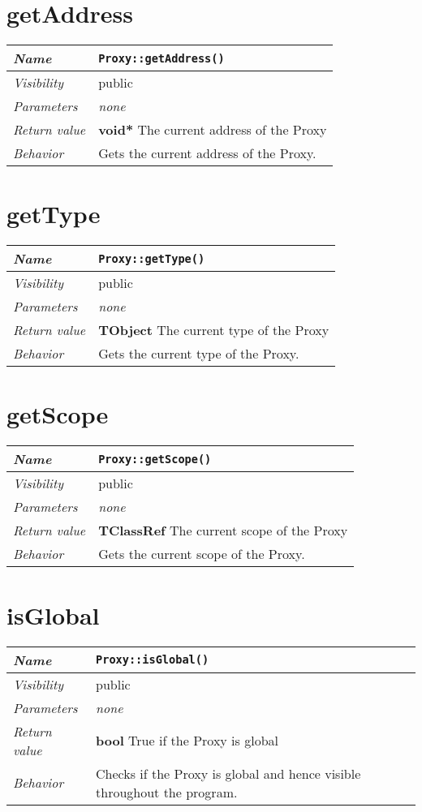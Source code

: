  \section{getAddress}
\begin{longtable}{p{3cm} @{\hskip 1cm} p{12cm}}
 \hline
\textit{Name} & \texttt{Proxy::getAddress()}\\
\hline
 \textit{Visibility} & public\\
\hline
\textit{Parameters} & \textit{none}\\
\hline
\textit{Return value} & \textbf{ void*} The current address of the Proxy \\
  \hline
 \textit{Behavior} & Gets the current address of the Proxy. \\
\hline
\end{longtable} \pagebreak
 \section{getType}
\begin{longtable}{p{3cm} @{\hskip 1cm} p{12cm}}
 \hline
\textit{Name} & \texttt{Proxy::getType()}\\
\hline
 \textit{Visibility} & public\\
\hline
\textit{Parameters} & \textit{none}\\
\hline
\textit{Return value} & \textbf{ TObject} The current type of the Proxy \\
  \hline
 \textit{Behavior} & Gets the current type of the Proxy. \\
\hline
\end{longtable} \pagebreak
 \section{getScope}
\begin{longtable}{p{3cm} @{\hskip 1cm} p{12cm}}
 \hline
\textit{Name} & \texttt{Proxy::getScope()}\\
\hline
 \textit{Visibility} & public\\
\hline
\textit{Parameters} & \textit{none}\\
\hline
\textit{Return value} & \textbf{ TClassRef} The current scope of the Proxy \\
  \hline
 \textit{Behavior} & Gets the current scope of the Proxy. \\
\hline
\end{longtable} \pagebreak
 \section{isGlobal}
\begin{longtable}{p{3cm} @{\hskip 1cm} p{12cm}}
 \hline
\textit{Name} & \texttt{Proxy::isGlobal()}\\
\hline
 \textit{Visibility} & public\\
\hline
\textit{Parameters} & \textit{none}\\
\hline
\textit{Return value} & \textbf{ bool} True if the Proxy is global \\
  \hline
 \textit{Behavior} & Checks if the Proxy is global and hence visible throughout the program. \\
\hline
\end{longtable} \pagebreak
